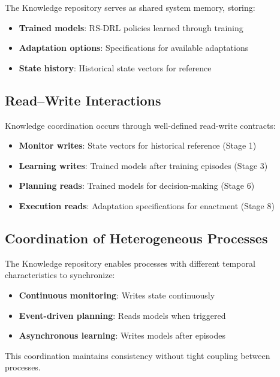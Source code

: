 \documentclass[11pt,a4paper]{article}
\begin{document}
The Knowledge repository serves as shared system memory, storing:

\begin{itemize}
    \item \textbf{Trained models}: RS-DRL policies learned through training
    \item \textbf{Adaptation options}: Specifications for available adaptations
    \item \textbf{State history}: Historical state vectors for reference
\end{itemize}

\subsection{Read--Write Interactions}

Knowledge coordination occurs through well-defined read-write contracts:

\begin{itemize}
    \item \textbf{Monitor writes}: State vectors for historical reference (Stage 1)
    \item \textbf{Learning writes}: Trained models after training episodes (Stage 3)
    \item \textbf{Planning reads}: Trained models for decision-making (Stage 6)
    \item \textbf{Execution reads}: Adaptation specifications for enactment (Stage 8)
\end{itemize}

\subsection{Coordination of Heterogeneous Processes}

The Knowledge repository enables processes with different temporal characteristics to synchronize:

\begin{itemize}
    \item \textbf{Continuous monitoring}: Writes state continuously
    \item \textbf{Event-driven planning}: Reads models when triggered
    \item \textbf{Asynchronous learning}: Writes models after episodes
\end{itemize}

This coordination maintains consistency without tight coupling between processes.
\end{document}
